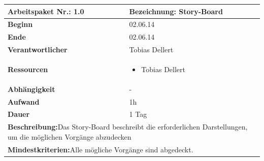 \documentclass[fontsize=12pt,paper=a4,twoside]{scrartcl}
\begin{document}
\begin{verbatim} 
\end{verbatim}

\begin{tabular}{|p{5.3cm}|p{9.7cm}|}\hline
	\textbf{Arbeitspaket Nr.:} 1.0 & \textbf{Bezeichnung:} Story-Board\\ \hline \hline
	\textbf{Beginn} & 02.06.14\\ \hline
	\textbf{Ende} & 02.06.14\\ \hline
	\textbf{Verantwortlicher} & Tobias Dellert\\ \hline
	\textbf{Ressourcen} & \begin{itemize}
		\item Tobias Dellert
	\end{itemize}    \\ \hline
	\textbf{Abhängigkeit} & -\\ \hline
	\textbf{Aufwand} & 1h\\ \hline
	\textbf{Dauer} & 1 Tag\\ \hline
	\multicolumn{2}{|p{15cm}|}{\textbf{Beschreibung:}\newline  Das Story-Board beschreibt die erforderlichen Darstellungen, um die möglichen Vorgänge abzudecken }\\ \hline
	\multicolumn{2}{|p{15cm}|}{\textbf{Mindestkriterien:}\newline Alle mögliche Vorgänge sind abgedeckt. }\\ \hline
\end{tabular}

\begin{verbatim} 
\end{verbatim}
\end{document}
